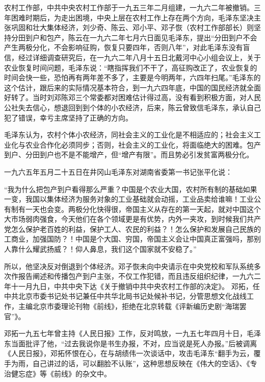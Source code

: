 \begin{maonote}
农村工作部，中共中央农村工作部于一九五三年二月组建，一九六二年被撤销。三年困难时期后，为走出困境，中央上层在农村工作上存在两个方向，毛泽东坚决主张巩固和壮大集体经济，刘少奇、陈云、邓小平、邓子恢（农村工作部部长）则坚持分田到户和包产，陈云在一九六二年七月六日面见毛泽东，提出“分田到户不会产生两极分化，不会影响征购，恢复只要四年，否则八年”，对此毛泽东没有盲信，经过详细调查研究后，在一九六二年八月十五日北戴河中心小组会议上，关于农业恢复时间问题，毛泽东说：“瞎指挥我们不干了，高征购改正了，农业恢复的时间会快一些，恐怕再有两年差不多了，主要是今明两年，六四年扫尾。”毛泽东的这个估计，跟后来的实际情况基本符合，到一九六四年底，中国的国民经济就全面好转了。当时刘邓陈邓三个常委都对困难估计得过高，没有看到积极方面，对人民公社失去信心，想退回到到个体的小农经济，后来，陈云曾致信毛泽东，承认自己犯了错误，幸亏主席坚持了正确的方向。

毛泽东认为，农村个体小农经济，同社会主义的工业化是不相适应的；社会主义工业化与农业合作化必须同步；否则，社会主义的工业化，将面临绝大的困难。包产到户、分田到户也不是不能增产，但“增产有限”。而且势必引发贫富两极分化。

一九六五年五月二十五日在井冈山毛泽东对湖南省委第一书记张平化说：

“我为什么把包产到户看得那么严重？中国是个农业大国，农村所有制的基础如果一变，我国以集体经济为服务对象的工业基础就会动摇，工业品卖给谁嘛！工业公有制有一天也会变。两极分化快得很，帝国主义从存在的第一天起，就对中国这个大市场弱肉强食，今天他们在各个领域更是有优势，内外一夹攻，到时候我们共产党怎么保护老百姓的利益，保护工人、农民的利益？！怎么保护和发展自己民族的工商业，加强国防？！中国是个大国、穷国，帝国主义会让中国真正富强吗，那别人靠什么耀武扬威？！仰人鼻息，我们这个国家就不安稳了。”

所以，他坚决反对倒退到个体经济。邓子恢未向中央请示在中央党校和军队系统多次作报告阐述和传播包产到户主张，不仅工作犯错，而且违反组织纪律，一九六二年十一月九日，中共中央下达《关于撤销中共中央农村工作部的决定》。
邓拓，任中共北京市委书记处书记兼任中共华北局书记处候补书记，分管思想文化战线工作，主编北京市委理论刊物《前线》，拒绝在北京转载《评新编历史剧“海瑞罢官”》。

邓拓一九五七年曾主持《人民日报》工作，反对鸣放，一九五七年四月十日，毛泽东当面批评了他，“过去我说你是书生办报，不对，应当说是死人办报。”后被调离《人民日报》，邓拓怀恨在心，在与胡绩伟一次谈话中，攻击毛泽东“翻手为云，覆手为雨，自己讲过的话，可以翻脸不认账”，这种思想反映在《伟大的空话》、《专治健忘症》等《前线》的杂文中。


\end{maonote}
